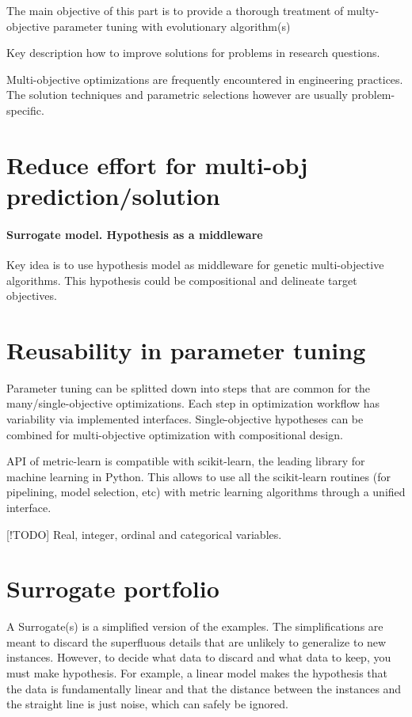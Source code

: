     The main objective of this part is to provide a thorough treatment of multy-objective parameter tuning with evolutionary algorithm(s)


    Key description how to improve solutions for problems in research questions.

    Multi-objective optimizations are frequently encountered in
    engineering practices. The solution techniques and parametric
    selections however are usually problem-specific. \cite{abs181207958}

    \section{Reduce effort for multi-obj prediction/solution}
        \paragraph{Surrogate model. Hypothesis as a middleware}
        Key idea is to use hypothesis model as middleware for genetic multi-objective algorithms.
        This hypothesis could be compositional and delineate target objectives. 

    \section{Reusability in parameter tuning}
        Parameter tuning can be splitted down into steps that are common for the many/single-objective optimizations. 
        Each step in optimization workflow has variability via implemented interfaces.
        Single-objective hypotheses can be combined for multi-objective optimization with compositional design.

        API of metric-learn is compatible with scikit-learn, the leading library for machine learning in Python. 
        This allows to use all the scikit-learn routines (for pipelining, model selection, etc) with metric learning algorithms through a unified interface.

        [!TODO] Real, integer, ordinal and categorical variables.

    \section{Surrogate portfolio}
        A Surrogate(s) is a simplified version of the examples. The simplifications are meant to discard the superfluous details that are unlikely to generalize to new instances. 
        However, to decide what data to discard and what data to keep, you must make hypothesis. 
        For example, a linear model makes the hypothesis that the data is fundamentally linear and that the distance between the instances and the straight line is just noise, 
        which can safely be ignored.

